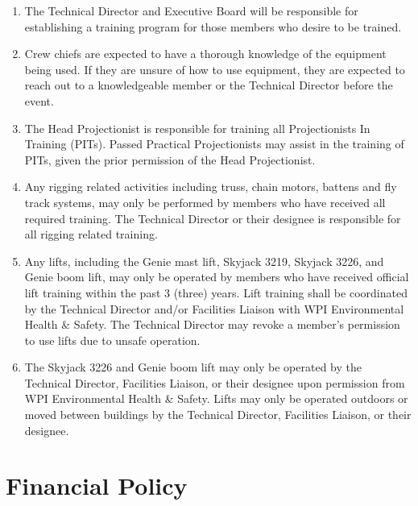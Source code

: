 \documentclass[12pt,letterpaper,oneside]{book}
\begin{document}
\begin{enumerate}

\item The Technical Director and Executive Board will be responsible for establishing a training program for those members who desire to be trained.
\item Crew chiefs are expected to have a thorough knowledge of the equipment being used. If they are unsure of how to use equipment, they are expected to reach out to a knowledgeable member or the Technical Director before the event.
\item The Head Projectionist is responsible for training all Projectionists In Training (PITs).
Passed Practical Projectionists may assist in the training of PITs, given the prior permission of the Head Projectionist.
\item Any rigging related activities including truss, chain motors, battens and fly track systems, may only be performed by members who have received all required training. The Technical Director or their designee is responsible for all rigging related training.
\item Any lifts, including the Genie mast lift, Skyjack 3219, Skyjack 3226, and Genie boom lift, may only be operated by members who have received official lift training within the past 3 (three) years. Lift training shall be coordinated by the Technical Director and/or Facilities Liaison with WPI Environmental Health \& Safety. The Technical Director may revoke a member's permission to use lifts due to unsafe operation.
\item The Skyjack 3226 and Genie boom lift may only be operated by the Technical Director, Facilities Liaison, or their designee upon permission from WPI Environmental Health \& Safety. Lifts may only be operated outdoors or moved between buildings by the Technical Director, Facilities Liaison, or their designee.

\end{enumerate}

\section{Financial Policy}
\end{document}
